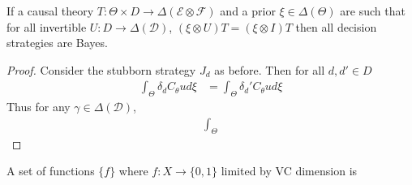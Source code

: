 \begin{theorem}
If a causal theory $T:\Theta\times D\to \Delta(\mathcal{E}\otimes\mathcal{F})$ and a prior $\xi\in \Delta(\Theta)$ are such that for all invertible $U:D\to \Delta(\mathcal{D})$, $(\xi\otimes U)T = (\xi\otimes I)T$ then all decision strategies are Bayes.
\end{theorem}

\begin{proof}
Consider the stubborn strategy $J_d$ as before. Then for all $d,d'\in D$
\begin{align}
	\int_\Theta \delta_d C_\theta u d\xi &= \int_\Theta \delta_d' C_\theta u d\xi
\end{align}
Thus for any $\gamma\in \Delta(\mathcal{D})$,
\begin{align}
	\int_\Theta 
\end{align}

\end{proof}
A set of functions $\{f\}$ where $f:X\to \{0,1\}$ limited by VC dimension is 